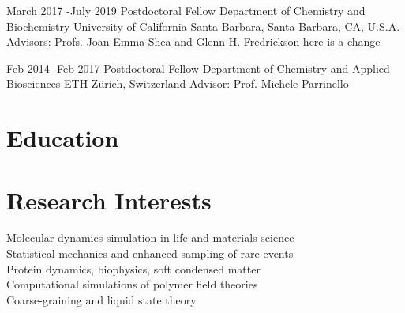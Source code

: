 \documentclass[10pt]{article} %
\begin{document}

\jobb
{March 2017 -}{July 2019}
{Postdoctoral Fellow}
{Department of Chemistry and Biochemistry }
{University of California Santa Barbara, Santa Barbara, CA, U.S.A.}
{Advisors: Profs. Joan-Emma Shea and Glenn H. Fredrickson  here is a change} 

\jobb
{Feb 2014 -}{Feb 2017}
{Postdoctoral Fellow}
{Department of Chemistry and Applied Biosciences}
{ETH Z{\"u}rich, Switzerland}
{Advisor: Prof. Michele Parrinello} 


\section{Education}


\section{Research Interests}

Molecular dynamics simulation in life and materials science \\
Statistical mechanics and enhanced sampling of rare events \\
Protein dynamics, biophysics, soft condensed matter \\
Computational simulations of polymer field theories \\
Coarse-graining and liquid state theory\\
\end{document}

